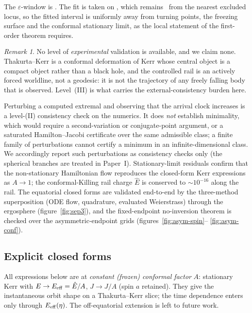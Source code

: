 \documentclass[12pt]{iopart}
\theoremstyle{plain}
\theoremstyle{definition}
\theoremstyle{remark}
\newtheorem{remark}[proposition]{Remark}
\newcommand{\Ehat}{\hat E}
\begin{document}
The $\varepsilon$-window is \provEpsWindow. The fit is taken on \provFitInterval, which
remains \provLocusSep\ from the nearest excluded locus, so the fitted interval is
uniformly away from turning points, the freezing surface and the conformal stationary
limit, as the local statement of the first-order theorem requires.

\begin{remark}
No level of \emph{experimental} validation is available, and we claim none.
Thakurta--Kerr is a conformal deformation of Kerr whose central object is a
compact object rather than a black hole, and the controlled rail is an actively
forced worldline, not a geodesic: it is not the trajectory of any freely falling
body that is observed. Level~(III) is what carries the external-consistency
burden here.
\end{remark}

Perturbing a computed extremal and observing that the arrival clock increases is
a level-(II) consistency check on the numerics. It does \emph{not} establish
minimality, which would require a second-variation or conjugate-point argument,
or a saturated Hamilton--Jacobi certificate over the same admissible class; a
finite family of perturbations cannot certify a minimum in an
infinite-dimensional class. We accordingly report such perturbations as
consistency checks only (the spherical branches are treated in Paper~I).
Stationary-limit residuals confirm
that the non-stationary Hamiltonian flow reproduces the closed-form Kerr expressions
as $A\to1$; the conformal-Killing rail charge $\Ehat$ is conserved to $\sim10^{-16}$ along the rail. The equatorial closed
forms are validated end-to-end by the three-method superposition
(ODE flow, quadrature, evaluated Weierstrass) through the ergosphere
(figure~\ref{fig:sep3}), and the fixed-endpoint no-inversion theorem is
checked over the asymmetric-endpoint grids (figures~\ref{fig:asym-spin}--%
\ref{fig:asym-conf}).

\subsection{Explicit closed forms}
\label{app:explicit}

All expressions below are at \emph{constant (frozen) conformal factor} $A$:
stationary Kerr with $E\to E_{\rm eff}=\Ehat/A$, $J\to J/A$ (spin $a$ retained). They give
the instantaneous orbit shape on a Thakurta--Kerr slice; the time dependence
enters only through $E_{\rm eff}(\eta)$. The off-equatorial extension is left to future work.
\end{document}
